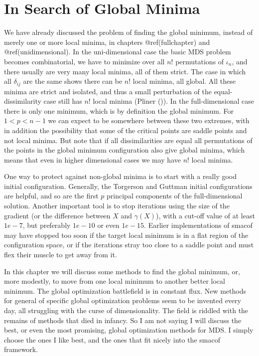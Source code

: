\documentclass[
  12pt,
  letterpaper,
  DIV=11,
  numbers=noendperiod]{scrreprt}
\theoremstyle{remark}
\begin{document}

\chapter{In Search of Global Minima}\label{global}

We have already discussed the problem of finding the global minimum,
instead of merely one or more local minima, in chapters
@ref(fullchapter) and @ref(unidimensional). In the uni-dimensional case
the basic MDS problem becomes combinatorial, we have to minimize over
all \(n!\) permutations of \(\iota_n\), and there usually are very many
local minima, all of them strict. The case in which all \(\delta_{ij}\)
are the same shows there can be \(n!\) local minima, all global. All
these minima are strict and isolated, and thus a small perturbation of
the equal-dissimilarity case still has \(n!\) local minima (Pliner
()). In the full-dimensional case there is
only one minimum, which is by definition the global minimum. For
\(1<p<n-1\) we can expect to be somewhere between these two extremes,
with in addition the possibility that some of the critical points are
saddle points and not local minima. But note that if all dissimilarities
are equal all permutations of the points in the global minimum
configuration also give global minima, which means that even in higher
dimensional cases we may have \(n!\) local minima.

One way to protect against non-global minima is to start with a really
good initial configuration. Generally, the Torgerson and Guttman initial
configurations are helpful, and so are the first \(p\) principal
components of the full-dimensional solution. Another important tool is
to stop iterations using the size of the gradient (or the difference
between \(X\) and \(\gamma(X)\)), with a cut-off value of at least
\(1e-7\), but preferably \(1e-10\) or even \(1e-15\). Earlier
implementations of smacof may have stopped too soon if the target local
minimum is in a flat region of the configuration space, or if the
iterations stray too close to a saddle point and must flex their muscle
to get away from it.

In this chapter we will discuss some methods to find the global minimum,
or, more modestly, to move from one local minimum to another better
local minimum. The global optimization battlefield is in constant flux.
New methods for general of specific global optimization problems seem to
be invented every day, all struggling with the curse of dimensionality.
The field is riddled with the remains of methods that died in infancy.
So I am not saying I will discuss the best, or even the most promising,
global optimization methods for MDS. I simply choose the ones I like
best, and the ones that fit nicely into the smacof framework.
\end{document}
